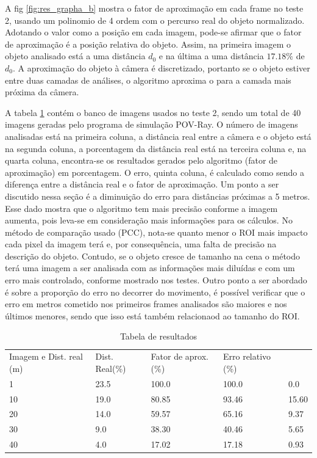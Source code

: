 A fig \ref{fig:res_grapha_b} mostra o fator de aproximação em cada frame
no teste 2, usando um polinomio de 4 ordem com o percurso real do objeto
normalizado.
Adotando o valor como a posição em cada imagem, pode-se afirmar que o 
fator de aproximação é a posição relativa do objeto. 
Assim, na primeira imagem o objeto analisado está a uma distância $d_0$
e na última a uma distância $17.18\%$ de $d_0$.
A aproximação do objeto à câmera é discretizado, portanto se o objeto
estiver entre duas camadas de análises, o algoritmo aproxima o para
a camada mais próxima da câmera.

A tabela \ref{tab:tab1} contém o banco de imagens usados no teste 2, sendo um total de 40 imagens geradas
pelo programa de simulação POV-Ray.
O número de imagens analisadas está na primeira coluna, a distância real entre a câmera e o objeto está na 
segunda coluna, a porcentagem da distância real está na terceira coluna e, na quarta coluna, encontra-se
os resultados gerados pelo algoritmo (fator de aproximação) em porcentagem. O erro, quinta coluna, é calculado 
como sendo a diferença entre a distância real e o fator de aproximação. 
Um ponto a ser discutido nessa seção é a diminuição do erro para distâncias próximas a 5 metros. Esse dado 
mostra que o algoritmo tem mais precisão conforme a imagem aumenta, pois leva-se em consideração mais informações
para os cálculos. No método de comparação usado (PCC), nota-se quanto menor o ROI mais impacto cada pixel da imagem
terá e, por consequência, uma falta de precisão na descrição do objeto. Contudo, se o objeto cresce de tamanho na cena
o método terá uma imagem a ser analisada com as informações mais diluídas e com um erro mais controlado, conforme
mostrado nos testes. Outro ponto a ser abordado é sobre a proporção do erro no decorrer do movimento, é possível
verificar que o erro em metros cometido nos primeiros frames analisados são maiores e nos últimos menores, sendo que
isso está também relacionaod ao tamanho do ROI. 

\begin{table}[H]
\setlength{\tabcolsep}{1 pt} 
\caption{Tabela de resultados}
\begin{tabular}{lllll}
Imagem e Dist. real (m) & Dist. Real(\%) & Fator de aprox. (\%) & Erro relativo (\%)\\
1 & 23.5 & 100.0 & 100.0 & 0.0 \\
10 & 19.0 & 80.85 & 93.46 & 15.60 \\
20 & 14.0 & 59.57 & 65.16 & 9.37 \\
30 & 9.0 & 38.30 & 40.46 & 5.65 \\
40 & 4.0 & 17.02 & 17.18 & 0.93
\end{tabular}
\label{tab:tab1}
\end{table}


